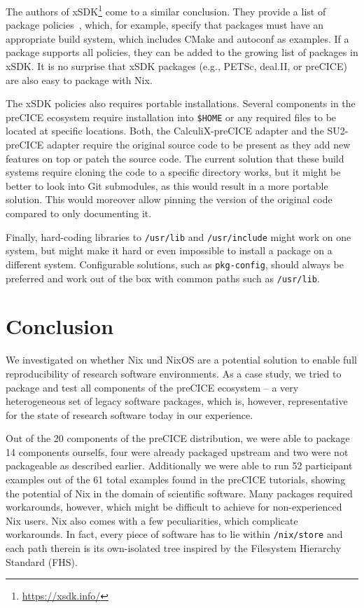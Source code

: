 \documentclass{eceasst}
\begin{document}
The authors of xSDK\footnote{\url{https://xsdk.info/}} come to a similar conclusion.
They provide a list of package policies~\cite{xSDK2023}, which, for example, specify that packages must have an appropriate build system, which includes CMake and autoconf as examples.
If a package supports all policies, they can be added to the growing list of packages in xSDK.
It is no surprise that xSDK packages (e.g., PETSc, deal.II, or preCICE) are also easy to package with Nix.

The xSDK policies also requires portable installations. Several components in the preCICE ecosystem require installation into \texttt{\$HOME} or any required files to be located at specific locations.
Both, the CalculiX-preCICE adapter and the SU2-preCICE adapter require the original source code to be present as they add new features on top or patch the source code.
The current solution that these build systems require cloning the code to a specific directory works, but it might be better to look into Git submodules, as this would result in a more portable solution.
This would moreover allow pinning the version of the original code compared to only documenting it.

Finally, hard-coding libraries to \texttt{/usr/lib} and \texttt{/usr/include} might work on one system, but might make it hard or even impossible to install a package on a different system.
Configurable solutions, such as \texttt{pkg-config}, should always be preferred and work out of the box with common paths such as \texttt{/usr/lib}.

\section{Conclusion}
\label{sec:conclusion}

We investigated on whether Nix und NixOS are a potential solution to enable full reproducibility of research software environments. As a case study, we tried to package and test all components of the preCICE ecosystem -- a very heterogeneous set of legacy software packages, which is, however, representative for the state of research software today in our experience.

Out of the 20 components of the preCICE distribution, we were able to package 14 components ourselfs, four were already packaged upstream and two were not packageable as described earlier.
Additionally we were able to run 52 participant examples out of the 61 total examples found in the preCICE tutorials, showing the potential of Nix in the domain of scientific software.
Many packages required workarounds, however, which might be difficult to achieve for non-experienced Nix users.
Nix also comes with a few peculiarities, which complicate workarounds.
In fact, every piece of software has to lie within \texttt{/nix/store} and each path therein is its own-isolated tree inspired by the Filesystem Hierarchy Standard (FHS).
\end{document}

